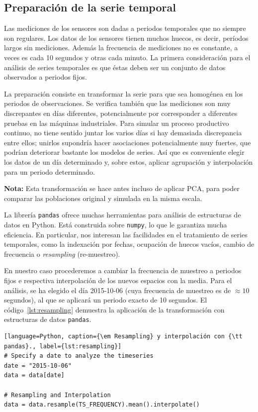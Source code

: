 \documentclass[11pt,spanish,listoffigures,listoftables]{tfgetsinf}
\begin{document}
        \subsection{Preparación de la serie temporal}
        Las mediciones de los sensores son dadas a periodos temporales que no siempre son regulares. Los datos de los sensores tienen muchos huecos, es decir, períodos largos sin mediciones. Además la frecuencia de mediciones no es constante, a veces es cada 10 segundos y otras cada minuto. La primera consideración para el análisis de series temporales es que éstas deben ser un conjunto de datos observados a periodos fijos. 
        
        La preparación consiste en transformar la serie para que sea homogénea en los periodos de observaciones. Se verifica también que las mediciones son muy discrepantes en días diferentes, potencialmente por corresponder a diferentes pruebas en las máquinas industriales. Para simular un proceso productivo continuo, no tiene sentido juntar los varios días si hay demasiada discrepancia entre ellos; unirlos supondría hacer asociaciones potencialmente muy fuertes, que podrían deteriorar bastante los modelos de series. Así que es conveniente elegir los datos de un día determinado y, sobre estos, aplicar agrupación y interpolación para un periodo determinado. 
        
        {\bf Nota:} Esta transformación se hace antes incluso de aplicar PCA, para poder comparar las poblaciones original y simulada en la misma escala.
        
        La librería {\tt pandas} ofrece muchas herramientas para análisis de estructuras de datos en Python. Está construida sobre {\tt numpy}, lo que le garantiza mucha eficiencia. En particular, nos interesan las facilidades en el tratamiento de series temporales, como la indexación por fechas, ocupación de huecos vacíos, cambio de frecuencia o {\em resampling} (re-muestreo). 
        
        En nuestro caso procederemos a cambiar la frecuencia de muestreo a periodos fijos e respectiva interpolación de los nuevos espacios con la media. Para el análisis, se ha elegido el día 2015-10-06 (cuya frecuencia de muestreo es de \(\approx 10\) segundos), al que se aplicará un periodo exacto de 10 segundos. El código~\ref{lst:resampling} demuestra la aplicación de la transformación con estructuras de datos {\tt pandas}.
        
    \begin{lstlisting}[language=Python, caption={\em Resampling} y interpolación con {\tt pandas}., label={lst:resampling}]
# Specify a date to analyze the timeseries
date = "2015-10-06"
data = data[date]

# Resampling and Interpolation
data = data.resample(TS_FREQUENCY).mean().interpolate()
    \end{lstlisting}
\end{document}
